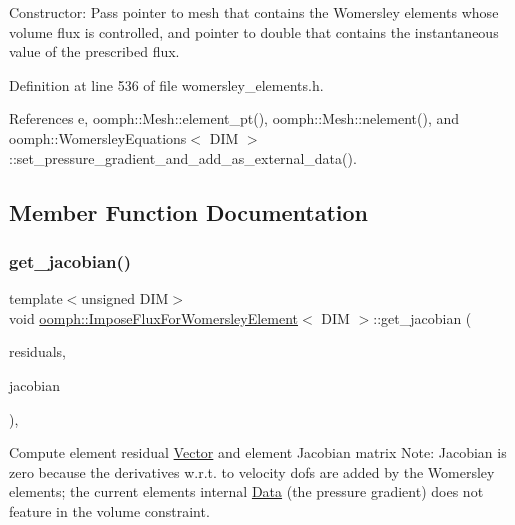 Constructor\+: Pass pointer to mesh that contains the Womersley elements whose volume flux is controlled, and pointer to double that contains the instantaneous value of the prescribed flux. 



Definition at line 536 of file womersley\+\_\+elements.\+h.



References e, oomph\+::\+Mesh\+::element\+\_\+pt(), oomph\+::\+Mesh\+::nelement(), and oomph\+::\+Womersley\+Equations$<$ D\+I\+M $>$\+::set\+\_\+pressure\+\_\+gradient\+\_\+and\+\_\+add\+\_\+as\+\_\+external\+\_\+data().



\subsection{Member Function Documentation}
\mbox{\label{classoomph_1_1ImposeFluxForWomersleyElement_a7c5c2bbd9577949c1fa78395930fd764}} 
\subsubsection{\texorpdfstring{get\+\_\+jacobian()}{get\_jacobian()}}
{\footnotesize\ttfamily template$<$unsigned D\+IM$>$ \\
void \hyperlink{classoomph_1_1ImposeFluxForWomersleyElement}{oomph\+::\+Impose\+Flux\+For\+Womersley\+Element}$<$ D\+IM $>$\+::get\+\_\+jacobian (\begin{DoxyParamCaption}\item[{\hyperlink{classoomph_1_1Vector}{Vector}$<$ double $>$ \&}]{residuals,  }\item[{\hyperlink{classoomph_1_1DenseMatrix}{Dense\+Matrix}$<$ double $>$ \&}]{jacobian }\end{DoxyParamCaption})\hspace{0.3cm}{\ttfamily [inline]}, {\ttfamily [virtual]}}



Compute element residual \hyperlink{classoomph_1_1Vector}{Vector} and element Jacobian matrix Note\+: Jacobian is zero because the derivatives w.\+r.\+t. to velocity dofs are added by the Womersley elements; the current element\textquotesingle{}s internal \hyperlink{classoomph_1_1Data}{Data} (the pressure gradient) does not feature in the volume constraint. 



